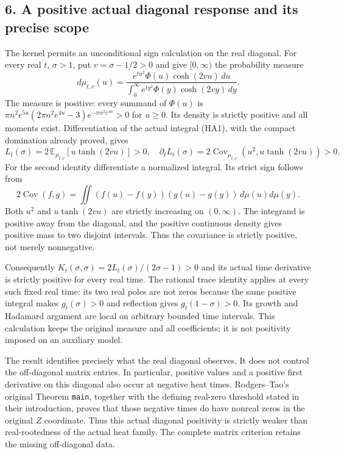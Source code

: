 \documentclass[
  10pt,
  a4paper,
]{article}
\begin{document}
\subsection{6. A positive actual diagonal response and its precise
scope}\label{a-positive-actual-diagonal-response-and-its-precise-scope}

The kernel permits an unconditional sign calculation on the real
diagonal. For every real \(t\), \(\sigma>1\), put \(v=\sigma-1/2>0\) and
give \([0,\infty)\) the probability measure \[
d\mu_{t,v}(u)=\frac{e^{tu^2}\Phi(u)\cosh(2vu)\,du}{\int_0^\infty e^{ty^2}\Phi(y)\cosh(2vy)\,dy}.
\tag{HA24}
\] The measure is positive: every summand of \(\Phi(u)\) is
\(\pi n^2e^{5u}(2\pi n^2e^{4u}-3)e^{-\pi n^2e^{4u}}>0\) for \(u\ge0\).
Its density is strictly positive and all moments exist. Differentiation
of the actual integral (HA1), with the compact domination already
proved, gives \[
L_t(\sigma)=2\,\mathbb E_{\mu_{t,v}}[u\tanh(2vu)]>0,
\quad
\partial_tL_t(\sigma)=2\operatorname{Cov}_{\mu_{t,v}}(u^2,u\tanh(2vu))>0.
\tag{HA25}
\] For the second identity differentiate a normalized integral. Its
strict sign follows from \[
2\operatorname{Cov}(f,g)=\iint(f(u)-f(y))(g(u)-g(y))\,d\mu(u)d\mu(y).
\tag{HA26}
\] Both \(u^2\) and \(u\tanh(2vu)\) are strictly increasing on
\((0,\infty)\). The integrand is positive away from the diagonal, and
the positive continuous density gives positive mass to two disjoint
intervals. Thus the covariance is strictly positive, not merely
nonnegative.

Consequently \(K_t(\sigma,\sigma)=2L_t(\sigma)/(2\sigma-1)>0\) and its
actual time derivative is strictly positive for every real time. The
rational trace identity applies at every such fixed real time: its two
real poles are not zeros because the same positive integral makes
\(g_t(\sigma)>0\) and reflection gives \(g_t(1-\sigma)>0\). Its growth
and Hadamard argument are local on arbitrary bounded time intervals.
This calculation keeps the original measure and all coefficients; it is
not positivity imposed on an auxiliary model.

The result identifies precisely what the real diagonal observes. It does
not control the off-diagonal matrix entries. In particular, positive
values and a positive first derivative on this diagonal also occur at
negative heat times. Rodgers--Tao's original Theorem \texttt{main},
together with the defining real-zero threshold stated in their
introduction, proves that those negative times do have nonreal zeros in
the original \(Z\) coordinate. Thus this actual diagonal positivity is
strictly weaker than real-rootedness of the actual heat family. The
complete matrix criterion retains the missing off-diagonal data.
\end{document}

